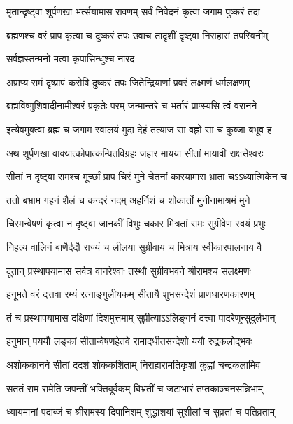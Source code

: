 \twolineshloka
{मृतान्दृष्ट्वा शूर्पणखा भर्त्सयामास रावणम्}
{सर्वं निवेदनं कृत्वा जगाम पुष्करं तदा}%


\twolineshloka
{ब्रह्मणश्च वरं प्राप कृत्वा च दुष्करं तपः}
{उवाच तादृशीं दृष्ट्वा निराहारां तपस्विनीम्}%

\onelineshloka
{सर्वज्ञस्तन्मनो मत्वा कृपासिन्धुश्च नारद}%


\twolineshloka
{अप्राप्य रामं दृष्प्रापं करोषि दुष्करं तपः}
{जितेन्द्रियाणां प्रवरं लक्ष्मणं धर्मलक्षणम्}%


\twolineshloka
{ब्रह्मविष्णुशिवादीनामीश्वरं प्रकृतेः परम्}
{जन्मान्तरे च भर्तारं प्राप्स्यसि त्वं वरानने}%


\twolineshloka
{इत्येवमुक्त्वा ब्रह्म च जगाम स्वालयं मुदा}
{देहं तत्याज सा वह्नो सा च कुब्जा बभूव ह}%


\twolineshloka
{अथ शूर्पणखा वाक्यात्कोपात्कम्पितविग्रहः}
{जहार मायया सीतां मायावी राक्षसेश्वरः}%


\twolineshloka
{सीतां न दृष्ट्वा रामश्च मूर्च्छां प्राप चिरं मुने}
{चेतनां कारयामास भ्राता चऽऽध्यात्मिकेन च}%


\twolineshloka
{ततो बभ्राम गहनं शैलं च कन्दरं नदम्}
{अहर्निशं च शोकार्तो मुनीनामाश्रमं मुने}%


\twolineshloka
{चिरमन्वेषणं कृत्वा न दृष्ट्वा जानकीं विभुः}
{चकार मित्रतां रामः सुग्रीवेण स्वयं प्रभुः}%


\twolineshloka
{निहत्य वालिनं बाणैर्ददौ राज्यं च लीलया}
{सुग्रीवाय च मित्राय स्वीकारपालनाय वै}%


\twolineshloka
{दूतान् प्रस्थापयामास सर्वत्र वानरेश्वाः}
{तस्थौ सुग्रीवभवने श्रीरामश्च सलक्ष्मणः}%


\twolineshloka
{हनूमते वरं दत्तवा रम्यं रत्नाङ्गुलीयकम्}
{सीतायै शुभसन्देशं प्राणधारणकारणम्}%


\twolineshloka
{तं च प्रस्थापयामास दक्षिणां दिशमुत्तमाम्}
{सुप्रीत्याऽऽलिङ्गनं दत्त्वा पादरेणून्सुदुर्लभान्}%


\twolineshloka
{हनुमान् पययौ लङ्कां सीतान्वेषणहेतवे}
{रामादधीतसन्देशो ययौ रुद्रकलोद्भवः}%


\twolineshloka
{अशोककानने सीतां ददर्श शोककर्शिताम्}
{निराहारामतिकृशां कुह्वां चन्द्रकलामिव}%


\twolineshloka
{सततं राम रामेति जपन्तीं भक्तिबूर्वकम्}
{बिभ्रतीं च जटाभारं तप्तकाञ्चनसन्निभाम्}%


\twolineshloka
{ध्यायमानां पदाब्जं च श्रीरामस्य दिपानिशम्}
{शुद्धाशयां सुशीलां च सुव्रतां च पतिव्रताम्}%


